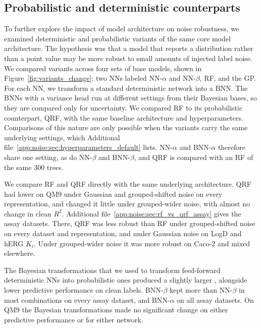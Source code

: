 \subsection{Probabilistic and deterministic counterparts}

To further explore the impact of model architecture on noise robustness, we examined deterministic and probabilistic variants of the same core model architecture. The hypothesis was that a model that reports a distribution rather than a point value may be more robust to small amounts of injected label noise. We compared variants across four sets of base models, shown in Figure~\ref{fig:variants_change}: two NNs labeled NN-$\alpha$ and NN-$\beta$, RF, and the GP. For each NN, we transform a standard deterministic network into a BNN. The BNNs with a variance head run at different settings from their Bayesian bases, so they are compared only for uncertainty. We compared RF to its probabilistic counterpart, QRF, with the same baseline architecture and hyperparameters. Comparisons of this nature are only possible when the variants carry the same underlying settings, which Additional file~\ref{app:noise:sec:hyperparameters_default} lists. NN-$\alpha$ and BNN-$\alpha$ therefore share one setting, as do NN-$\beta$ and BNN-$\beta$, and QRF is compared with an RF of the same 300 trees.

We compare RF and QRF directly with the same underlying architecture. QRF had lower \aucnorm{} on QM9 under Gaussian and grouped-shifted noise on every representation, and changed it little under grouped-wider noise, with almost no change in clean $R^2$. Additional file~\ref{app:noise:sec:rf_vs_qrf_assay} gives the assay datasets. There, QRF was less robust than RF under grouped-shifted noise on every dataset and representation, and under Gaussian noise on LogD and hERG $K_i$. Under grouped-wider noise it was more robust on Caco-2 and mixed elsewhere.

The Bayesian transformations that we used to transform feed-forward deterministic NNs into probabilistic ones produced a slightly larger \aucnorm, alongside lower predictive performance on clean labels. BNN-$\beta$ kept more \aucnorm{} than NN-$\beta$ in most combinations on every assay dataset, and BNN-$\alpha$ on all assay datasets. On QM9 the Bayesian transformations made no significant change on either predictive performance or \aucnorm{} for either network.

